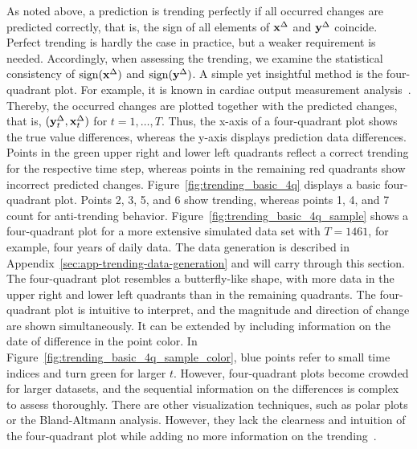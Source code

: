 As noted above, a prediction is trending perfectly if all occurred changes are predicted correctly, that is, the sign of all elements of $\mathbf{x}^{\Delta}$ and $\mathbf{y}^{\Delta}$ coincide.
Perfect trending is hardly the case in practice, but a weaker requirement is needed.
Accordingly, when assessing the trending, we examine the statistical consistency of $\operatorname{sign}(\mathbf{x}^{\Delta})$ and $\operatorname{sign}(\mathbf{y}^{\Delta})$.
A simple yet insightful method is the four-quadrant plot.
For example, it is known in cardiac output measurement analysis~\parencite{Saugel2015}.  
Thereby, the occurred changes are plotted together with the predicted changes, that is, $(\mathbf{y}^{\Delta}_t, \mathbf{x}^{\Delta}_t)$ for $t = 1, \dots, T$.
Thus, the x-axis of a four-quadrant plot shows the true value differences, whereas the y-axis displays prediction data differences.
Points in the green upper right and lower left quadrants reflect a correct trending for the respective time step, whereas points in the remaining red quadrants show incorrect predicted changes.
Figure~\ref{fig:trending_basic_4q} displays a basic four-quadrant plot.
Points 2, 3, 5, and 6 show trending, whereas points 1, 4, and 7 count for anti-trending behavior.
Figure~\ref{fig:trending_basic_4q_sample} shows a four-quadrant plot for a more extensive simulated data set with $T=1461$, for example, four years of daily data.
The data generation is described in Appendix~\ref{sec:app-trending-data-generation} and will carry through this section.
The four-quadrant plot resembles a butterfly-like shape, with more data in the upper right and lower left quadrants than in the remaining quadrants.
The four-quadrant plot is intuitive to interpret, and the magnitude and direction of change are shown simultaneously.
It can be extended by including information on the date of difference in the point color.
In Figure~\ref{fig:trending_basic_4q_sample_color}, blue points refer to small time indices and turn green for larger $t$.
However, four-quadrant plots become crowded for larger datasets, and the sequential information on the differences is complex to assess thoroughly.
There are other visualization techniques, such as polar plots or the Bland-Altmann analysis.
However, they lack the clearness and intuition of the four-quadrant plot while adding no more information on the trending~\parencite{Saugel2015}.

